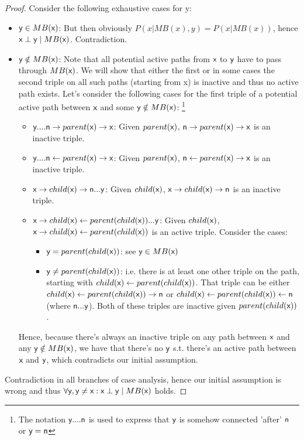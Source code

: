 \documentclass[12pt,a4paper,oneside]{article}
\newcommand{\ra}{\rightarrow}
\newcommand{\la}{\leftarrow}
\begin{document}
\begin{proof}
\noindent
Consider the following exhaustive cases for y:
\begin{itemize}
\item $\rv{y} \in MB(\rv{x})$: But then obviously $P(x|MB(x),y) = P(x|MB(x))$, hence $\rv{x} \perp \rv{y} \; | \; MB(\rv{x})$. Contradiction.
\item $\rv{y} \notin MB(\rv{x})$: Note that all potential active paths from $\rv{x}$ to $\rv{y}$ have to pass through $MB(\rv{x})$. We will show that either the first or in some cases the second triple on all such paths (starting from x) is inactive and thus no active path exists. Let's consider the following cases for the first triple of a potential active path between $\rv{x}$ and some $\rv{y} \notin MB(\rv{x})$: \footnote{The notation $\rv{y} .... \rv{n}$ is used to express that $\rv{y}$ is somehow connected 'after' $\rv{n}$ or $\rv{y}=\rv{n}$}
	\begin{itemize}
	\item $\rv{y} .... \rv{n} \ra parent(\rv{x}) \ra \rv{x}$: Given $parent(\rv{x})$, $\rv{n} \ra parent(\rv{x}) \ra \rv{x}$ is an inactive triple.
	\item $\rv{y} .... \rv{n} \la parent(\rv{x}) \ra \rv{x}$: Given $parent(\rv{x})$, $\rv{n} \la parent(\rv{x}) \ra \rv{x}$ is an inactive triple.
	\item $\rv{x} \ra child(\rv{x}) \ra \rv{n} ... \rv{y}$: Given $child(\rv{x})$, $\rv{x} \ra child(\rv{x}) \ra \rv{n}$ is an inactive triple.
	\item $\rv{x} \ra child(\rv{x}) \la parent(child(\rv{x})) ... \rv{y}$: Given $child(\rv{x})$, $\rv{x} \ra child(\rv{x}) \la parent(child(\rv{x}))$ is an active triple. Consider the cases:
		\begin{itemize}
		\item $\rv{y} = parent(child(\rv{x}))$: see $\rv{y} \in MB(\rv{x})$
		\item $\rv{y} \neq parent(child(\rv{x}))$: i.e. there is at least one other triple on the path, starting with $child(\rv{x}) \la parent(child(\rv{x}))$. That triple can be either $child(\rv{x}) \la parent(child(\rv{x})) \ra \rv{n}$ or $child(\rv{x}) \la parent(child(\rv{x})) \la \rv{n}$ (where $\rv{n}...\rv{y}$). Both of these triples are inactive given $parent(child(\rv{x}))$.
		\end{itemize}
	\end{itemize}
	Hence, because there's always an inactive triple on any path between $\rv{x}$ and any $\rv{y} \notin MB(\rv{x})$, we have that there's no $\rv{y}$ s.t. there's an active path between $\rv{x}$ and $\rv{y}$, which contradicts our initial assumption.
\end{itemize}
Contradiction in all branches of case analysis, hence our initial assumption is wrong and thus $\forall \rv{y}, \rv{y} \neq \rv{x}: \rv{x} \perp \rv{y} \; | \; MB(\rv{x})$ holds.
\end{proof}
\end{document}
